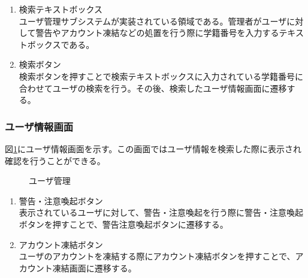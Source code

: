 \documentclass[a4j]{jarticle}
\begin{document}
\begin{enumerate}
  \renewcommand{\labelenumi}{\textcircled{\scriptsize \theenumi}}

\item 検索テキストボックス\\
ユーザ管理サブシステムが実装されている領域である。管理者がユーザに対して警告やアカウント凍結などの処置を行う際に学籍番号を入力するテキストボックスである。

\item 検索ボタン\\
検索ボタンを押すことで検索テキストボックスに入力されている学籍番号に合わせてユーザの検索を行う。その後、検索したユーザ情報画面に遷移する。


\end{enumerate}


\subsubsection{ユーザ情報画面}
図\ref{fig:user_info}にユーザ情報画面を示す。この画面ではユーザ情報を検索した際に表示され確認を行うことができる。
\begin{figure}[H]
\centering
{}
\caption{ユーザ管理}
\label{fig:user_info}
\end{figure}

\begin{enumerate}
  \renewcommand{\labelenumi}{\textcircled{\scriptsize \theenumi}}

\item 警告・注意喚起ボタン\\
表示されているユーザに対して、警告・注意喚起を行う際に警告・注意喚起ボタンを押すことで、警告注意喚起ボタンに遷移する。
\item アカウント凍結ボタン\\
ユーザのアカウントを凍結する際にアカウント凍結ボタンを押すことで、アカウント凍結画面に遷移する。

\end{enumerate}
\end{document}
